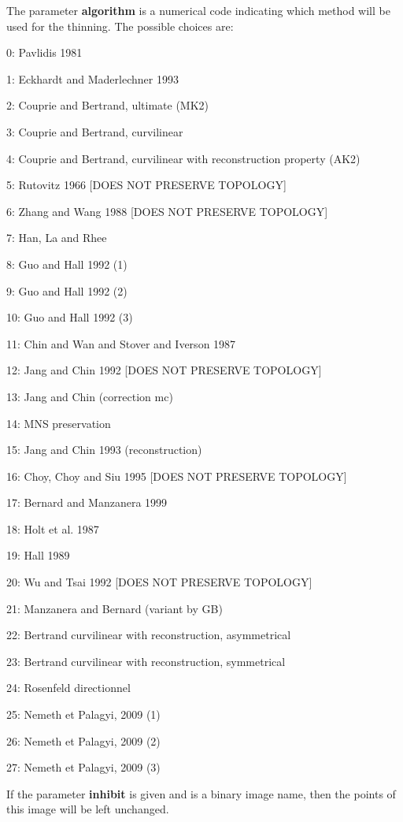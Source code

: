 The parameter {\bfseries algorithm} is a numerical code indicating which method will be used for the thinning. The possible choices are: \begin{DoxyItemize}
\item 0: Pavlidis 1981 \item 1: Eckhardt and Maderlechner 1993 \item 2: Couprie and Bertrand, ultimate (MK2) \item 3: Couprie and Bertrand, curvilinear \item 4: Couprie and Bertrand, curvilinear with reconstruction property (AK2) \item 5: Rutovitz 1966 [DOES NOT PRESERVE TOPOLOGY] \item 6: Zhang and Wang 1988 [DOES NOT PRESERVE TOPOLOGY] \item 7: Han, La and Rhee \item 8: Guo and Hall 1992 (1) \item 9: Guo and Hall 1992 (2) \item 10: Guo and Hall 1992 (3) \item 11: Chin and Wan and Stover and Iverson 1987 \item 12: Jang and Chin 1992 [DOES NOT PRESERVE TOPOLOGY] \item 13: Jang and Chin (correction mc) \item 14: MNS preservation \item 15: Jang and Chin 1993 (reconstruction) \item 16: Choy, Choy and Siu 1995 [DOES NOT PRESERVE TOPOLOGY] \item 17: Bernard and Manzanera 1999 \item 18: Holt et al. 1987 \item 19: Hall 1989 \item 20: Wu and Tsai 1992 [DOES NOT PRESERVE TOPOLOGY] \item 21: Manzanera and Bernard (variant by GB) \item 22: Bertrand curvilinear with reconstruction, asymmetrical \item 23: Bertrand curvilinear with reconstruction, symmetrical \item 24: Rosenfeld directionnel \item 25: Nemeth et Palagyi, 2009 (1) \item 26: Nemeth et Palagyi, 2009 (2) \item 27: Nemeth et Palagyi, 2009 (3)\end{DoxyItemize}
If the parameter {\bfseries inhibit} is given and is a binary image name, then the points of this image will be left unchanged.

